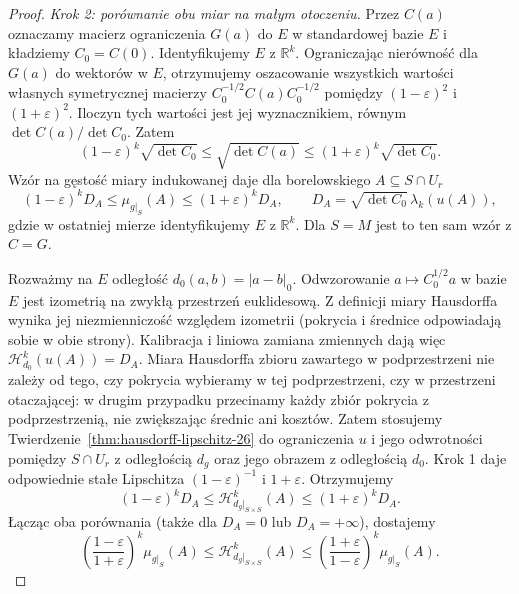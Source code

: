 \begin{proof}
\emph{Krok 2: porównanie obu miar na małym otoczeniu.}
Przez $C(a)$ oznaczamy macierz ograniczenia $G(a)$
do $E$ w standardowej bazie $E$ i kładziemy $C_0=C(0)$.
Identyfikujemy $E$ z $\mathbb R^k$. Ograniczając
nierówność dla $G(a)$ do wektorów w $E$, otrzymujemy
oszacowanie wszystkich wartości własnych symetrycznej
macierzy $C_0^{-1/2}C(a)C_0^{-1/2}$ pomiędzy
$(1-\varepsilon)^2$ i $(1+\varepsilon)^2$.
Iloczyn tych wartości jest jej wyznacznikiem,
równym $\det C(a)/\det C_0$. Zatem
\[
 (1-\varepsilon)^k\sqrt{\det C_0}
 \le\sqrt{\det C(a)}
 \le(1+\varepsilon)^k\sqrt{\det C_0}.
\]
Wzór na gęstość miary indukowanej daje dla
borelowskiego $A\subseteq S\cap U_r$
\[
 (1-\varepsilon)^k D_A\le\mu_{g|_S}(A)
 \le(1+\varepsilon)^k D_A,\qquad
 D_A=\sqrt{\det C_0}\,\lambda_k(u(A)),
\]
gdzie w ostatniej mierze identyfikujemy $E$ z $\mathbb R^k$.
Dla $S=M$ jest to ten sam wzór z $C=G$.

Rozważmy na $E$ odległość $d_0(a,b)=|a-b|_0$.
Odwzorowanie $a\mapsto C_0^{1/2}a$ w bazie $E$
jest izometrią na zwykłą przestrzeń euklidesową.
Z definicji miary Hausdorffa wynika jej niezmienniczość
względem izometrii (pokrycia i średnice odpowiadają
sobie w obie strony). Kalibracja i liniowa zamiana
zmiennych dają więc $\mathcal H^k_{d_0}(u(A))=D_A$.
Miara Hausdorffa zbioru zawartego w podprzestrzeni
nie zależy od tego, czy pokrycia wybieramy w tej
podprzestrzeni, czy w przestrzeni otaczającej:
w drugim przypadku przecinamy każdy zbiór pokrycia
z podprzestrzenią, nie zwiększając średnic ani kosztów.
Zatem stosujemy Twierdzenie~\ref{thm:hausdorff-lipschitz-26}
do ograniczenia $u$ i jego odwrotności pomiędzy
$S\cap U_r$ z odległością $d_g$ oraz jego obrazem
z odległością $d_0$. Krok 1 daje odpowiednie stałe
Lipschitza $(1-\varepsilon)^{-1}$ i $1+\varepsilon$.
Otrzymujemy
\[
 (1-\varepsilon)^kD_A
 \le\mathcal H^k_{d_g|_{S\times S}}(A)
 \le(1+\varepsilon)^kD_A.
\]
Łącząc oba porównania (także dla $D_A=0$ lub
$D_A=+\infty$), dostajemy
\[
 \left(\frac{1-\varepsilon}{1+\varepsilon}\right)^k
 \mu_{g|_S}(A)
 \le\mathcal H^k_{d_g|_{S\times S}}(A)
 \le
 \left(\frac{1+\varepsilon}{1-\varepsilon}\right)^k
 \mu_{g|_S}(A).
\]


\end{proof}

